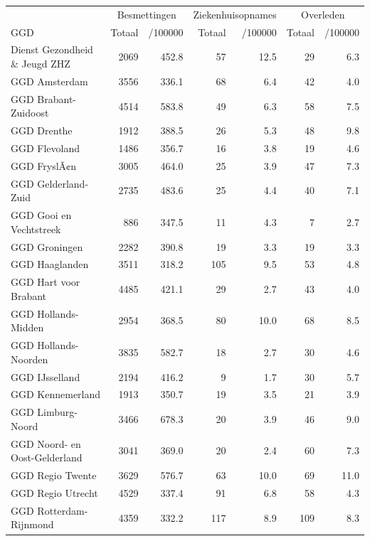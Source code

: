\documentclass[
  english,
  man,floatsintext]{apa6}
\begin{document}
\begin{table}[H]
\centering\begingroup\fontsize{10}{12}\selectfont

\begin{threeparttable}
\begin{tabular}{lrrrrrr}
\toprule
\multicolumn{1}{c}{ } & \multicolumn{2}{c}{Besmettingen} & \multicolumn{2}{c}{Ziekenhuisopnames} & \multicolumn{2}{c}{Overleden} \\
\cmidrule(l{3pt}r{3pt}){2-3} \cmidrule(l{3pt}r{3pt}){4-5} \cmidrule(l{3pt}r{3pt}){6-7}
GGD & Totaal & /100000 & Totaal & /100000 & Totaal & /100000\\
\midrule
Dienst Gezondheid \& Jeugd ZHZ & 2069 & 452.8 & 57 & 12.5 & 29 & 6.3\\
GGD Amsterdam & 3556 & 336.1 & 68 & 6.4 & 42 & 4.0\\
GGD Brabant-Zuidoost & 4514 & 583.8 & 49 & 6.3 & 58 & 7.5\\
GGD Drenthe & 1912 & 388.5 & 26 & 5.3 & 48 & 9.8\\
GGD Flevoland & 1486 & 356.7 & 16 & 3.8 & 19 & 4.6\\
GGD FryslÃ¢n & 3005 & 464.0 & 25 & 3.9 & 47 & 7.3\\
GGD Gelderland-Zuid & 2735 & 483.6 & 25 & 4.4 & 40 & 7.1\\
GGD Gooi en Vechtstreek & 886 & 347.5 & 11 & 4.3 & 7 & 2.7\\
GGD Groningen & 2282 & 390.8 & 19 & 3.3 & 19 & 3.3\\
GGD Haaglanden & 3511 & 318.2 & 105 & 9.5 & 53 & 4.8\\
GGD Hart voor Brabant & 4485 & 421.1 & 29 & 2.7 & 43 & 4.0\\
GGD Hollands-Midden & 2954 & 368.5 & 80 & 10.0 & 68 & 8.5\\
GGD Hollands-Noorden & 3835 & 582.7 & 18 & 2.7 & 30 & 4.6\\
GGD IJsselland & 2194 & 416.2 & 9 & 1.7 & 30 & 5.7\\
GGD Kennemerland & 1913 & 350.7 & 19 & 3.5 & 21 & 3.9\\
GGD Limburg-Noord & 3466 & 678.3 & 20 & 3.9 & 46 & 9.0\\
GGD Noord- en Oost-Gelderland & 3041 & 369.0 & 20 & 2.4 & 60 & 7.3\\
GGD Regio Twente & 3629 & 576.7 & 63 & 10.0 & 69 & 11.0\\
GGD Regio Utrecht & 4529 & 337.4 & 91 & 6.8 & 58 & 4.3\\
GGD Rotterdam-Rijnmond & 4359 & 332.2 & 117 & 8.9 & 109 & 8.3\\

\end{tabular}
\end{threeparttable}
\end{table}
\end{document}
